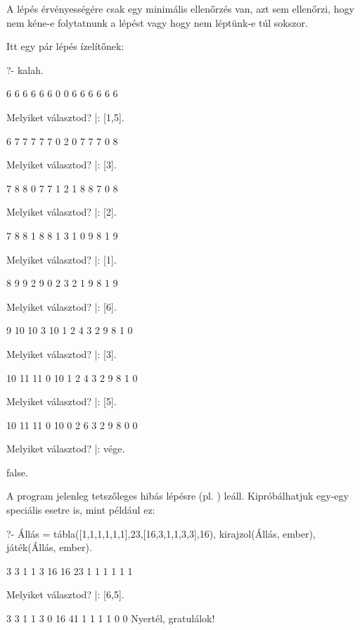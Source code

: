 A lépés érvényességére csak egy minimális ellenőrzés
van, azt sem ellenőrzi, hogy nem kéne-e folytatnunk
a lépést vagy hogy nem léptünk-e túl sokszor.

Itt egy pár lépés ízelítőnek:
\begin{query}
?- kalah.

     6    6    6    6    6    6
0                                  0
     6    6    6    6    6    6

Melyiket választod?
|: [1,5].

     6    7    7    7    7    7
0                                  2
     0    7    7    7    0    8

Melyiket választod?
|: [3].

     7    8    8    0    7    7
1                                  2
     1    8    8    7    0    8

Melyiket választod?
|: [2].

     7    8    8    1    8    8
1                                  3
     1    0    9    8    1    9

Melyiket választod?
|: [1].

     8    9    9    2    9    0
2                                  3
     2    1    9    8    1    9

Melyiket választod?
|: [6].

     9    10   10   3    10   1
2                                  4
     3    2    9    8    1    0

Melyiket választod?
|: [3].

     10   11   11   0    10   1
2                                  4
     3    2    9    8    1    0

Melyiket választod?
|: [5].

     10   11   11   0    10   0
2                                  6
     3    2    9    8    0    0

Melyiket választod?
|: vége.

false.
\end{query}

A program jelenleg tetszőleges hibás lépésre
(pl. ) leáll. Kipróbálhatjuk egy-egy
speciális esetre is, mint például ez:
\begin{query}
?- Állás = tábla([1,1,1,1,1,1],23,[16,3,1,1,3,3],16),
   kirajzol(Állás, ember), játék(Állás, ember).

     3    3    1    1    3    16
16                                  23
     1    1    1    1    1    1

Melyiket választod?
|: [6,5].

     3    3    1    1    3    0
16                                  41
     1    1    1    1    0    0
Nyertél, gratulálok!
\end{query}

